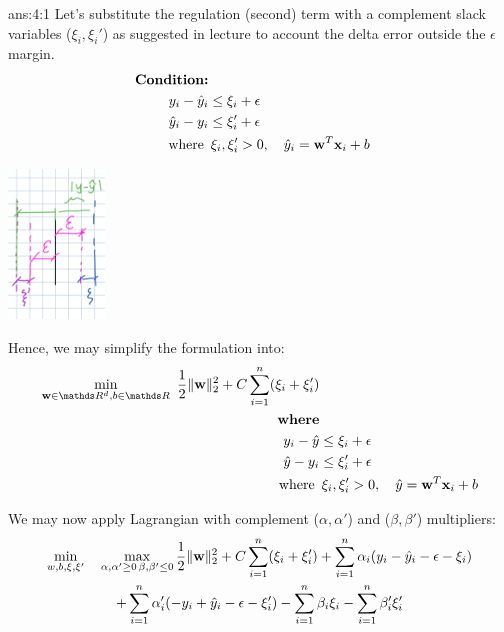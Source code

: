\documentclass{tron}
\begin{document}
\clearpage
\setcounter{answer}{0}
\begin{answer}{ans:4:1}
	Let's substitute the regulation (second) term with a complement slack variables ($\xi_i, \xi_i'$) as suggested in lecture to account the delta error outside the $\epsilon$ margin.
	\begin{align}
		\textbf{Condition:}\\
		y_i - \hat{y}_i & \leq \xi_i + \epsilon \\
		\hat{y}_i - y_i & \leq \xi_i' + \epsilon \\
		\text{where } &  \,\xi_i,\xi_i'>0 , \quad \hat{y}_i = \mathbf{w}^T \mathbf{x}_i + b
	\end{align}

	\begin{center}
		\includegraphics[height=150px]{Fig/slack}	
	\end{center}
		
	Hence, we may simplify the formulation  into:
	\begin{align}
			\min_{\wv\in \RR^d, 
b\in\RR}  ~ \frac{1}{2} \|\wv\|_2^2 + C\sum_{i=1}^n (\xi_i + \xi_i') & \\
		\textbf{where} &  \\
		y_i - \hat{y} & \leq \xi_i + \epsilon \\
		\hat{y} - y_i & \leq \xi_i' + \epsilon \\
		\text{where } &  \,\xi_i,\xi_i'>0 , \quad \hat{y} = \wv^T \xv_i + b
	\end{align}

	We may now apply Lagrangian with complement ($\alpha, \alpha'$) and ($\beta, \beta'$) multipliers:
	\begin{multline}
		\min_{w, b, \xi, \xi'} \quad \max_{\alpha, \alpha' \geq 0  \, \beta, \beta' \leq 0} 
		\frac12 \| \mathbf{w}\|_2^2 + C\sum_{i=1}^n (\xi_i + \xi_i') 
		+ \sum_{i=1}^n \alpha_i (y_i - \hat{y}_i - \epsilon - \xi_i)  \\
		+ \sum_{i=1}^n \alpha_i' (- y_i + \hat{y}_i - \epsilon - \xi_i') 
		- \sum_{i=1}^n \beta_i \xi_i - \sum_{i=1}^n \beta_i' \xi_i' 
	\end{multline}	


\end{answer}
\end{document}
